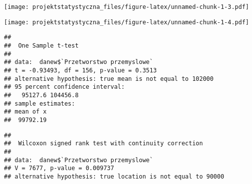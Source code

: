 \documentclass[
]{article}
\newenvironment{Shaded}{\begin{snugshade}}{\end{snugshade}}
\newcommand{\AttributeTok}[1]{\textcolor[rgb]{0.77,0.63,0.00}{#1}}
\newcommand{\CommentTok}[1]{\textcolor[rgb]{0.56,0.35,0.01}{\textit{#1}}}
\newcommand{\DecValTok}[1]{\textcolor[rgb]{0.00,0.00,0.81}{#1}}
\newcommand{\DocumentationTok}[1]{\textcolor[rgb]{0.56,0.35,0.01}{\textbf{\textit{#1}}}}
\newcommand{\FunctionTok}[1]{\textcolor[rgb]{0.00,0.00,0.00}{#1}}
\newcommand{\NormalTok}[1]{#1}
\newcommand{\OtherTok}[1]{\textcolor[rgb]{0.56,0.35,0.01}{#1}}
\newcommand{\SpecialCharTok}[1]{\textcolor[rgb]{0.00,0.00,0.00}{#1}}
\newcommand{\StringTok}[1]{\textcolor[rgb]{0.31,0.60,0.02}{#1}}
\begin{document}
\texttt{[image: projektstatystyczna\_files/figure-latex/unnamed-chunk-1-3.pdf]}

\begin{Shaded}
\end{Shaded}

\texttt{[image: projektstatystyczna\_files/figure-latex/unnamed-chunk-1-4.pdf]}

\begin{Shaded}
\end{Shaded}

\begin{verbatim}
## 
##  One Sample t-test
## 
## data:  danew$`Przetworstwo przemyslowe`
## t = -0.93493, df = 156, p-value = 0.3513
## alternative hypothesis: true mean is not equal to 102000
## 95 percent confidence interval:
##   95127.6 104456.8
## sample estimates:
## mean of x 
##  99792.19
\end{verbatim}

\begin{Shaded}
\end{Shaded}

\begin{verbatim}
## 
##  Wilcoxon signed rank test with continuity correction
## 
## data:  danew$`Przetworstwo przemyslowe`
## V = 7677, p-value = 0.009737
## alternative hypothesis: true location is not equal to 90000
\end{verbatim}
\end{document}
